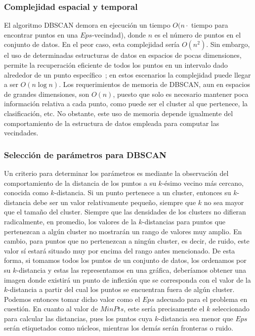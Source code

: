 \subsubsection{Complejidad espacial y temporal}

El algoritmo DBSCAN demora en ejecución un tiempo $O(n \cdot$ tiempo para encontrar puntos en una $Eps$-vecindad), donde $n$ es el número de puntos en el conjunto de datos.
En el peor caso, esta complejidad sería $O(n^2)$.
Sin embargo, el uso de determinadas estructuras de datos en espacios de pocas dimensiones, permite la recuperación eficiente de todos los puntos en un intervalo dado alrededor de un punto específico~\cite{Tan05};
en estos escenarios la complejidad puede llegar a ser $O(n\log n)$.
Los requerimientos de memoria de DBSCAN, aun en espacios de grandes dimensiones, son $O(n)$, puesto que solo es necesario mantener poca información relativa a cada punto, como puede ser el cluster al que pertenece, la clasificación, etc.
No obstante, este uso de memoria depende igualmente del comportamiento de la estructura de datos empleada para computar las vecindades.

\subsubsection{Selección de parámetros para DBSCAN}

Un criterio para determinar los parámetros es mediante la observación del comportamiento de la distancia de los puntos a su $k$-ésimo vecino más cercano, conocida como $k$-distancia.
Si un punto pertenece a un cluster, entonces su $k$-distancia debe ser un valor relativamente pequeño, siempre que $k$ no sea mayor que el tamaño del cluster.
Siempre que las densidades de los clusters no difieran radicalmente, en promedio, los valores de la $k$-distancias para puntos que pertenezcan a algún cluster no mostrarán un rango de valores muy amplio.
En cambio, para puntos que no pertenezcan a ningún cluster, es decir, de ruido, este valor sí estará situado muy por encima del rango antes mencionado.
De esta forma, si tomamos todos los puntos de un conjunto de datos, los ordenamos por su $k$-distancia y estas las representamos en una gráfica, deberíamos obtener una imagen donde existirá un punto de inflexión que se corresponda con el valor de la $k$-distancia a partir del cual los puntos se encuentran fuera de algún cluster.
Podemos entonces tomar dicho valor como el $Eps$ adecuado para el problema en cuestión.
En cuanto al valor de $MinPts$, este sería precisamente el $k$ seleccionado para calcular las distancias, pues los puntos cuya $k$-distancia sea menor que $Eps$ serán etiquetados como núcleos, mientras los demás serán fronteras o ruido.


